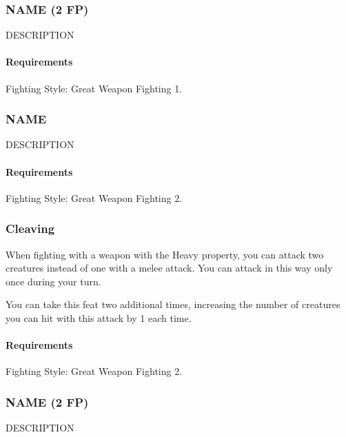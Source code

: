\subsubsection{NAME (2 FP)} \label{feat::name}
    DESCRIPTION
    \paragraph{Requirements} Fighting Style: Great Weapon Fighting 1.
\subsubsection{NAME} \label{feat::name}
    DESCRIPTION
    \paragraph{Requirements} Fighting Style: Great Weapon Fighting 2.
\subsubsection{Cleaving} \label{feat::cleaving}
    When fighting with a weapon with the Heavy property, you can attack two creatures instead of one with a melee attack.
    You can attack in this way only once during your turn.

    You can take this feat two additional times, increasing the number of creatures you can hit with this attack by 1 each time.
    \paragraph{Requirements} Fighting Style: Great Weapon Fighting 2.
\subsubsection{NAME (2 FP)} \label{feat::name}
    DESCRIPTION
